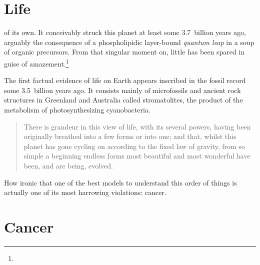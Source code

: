 \documentclass{tufte-book}
\begin{document}
\section{Life}

 of its own.  It conceivably struck this
planet at least some 3.7~billion years ago,\cite{schopf_evidence_2007}
arguably the consequence of a phospholipidic \mbox{layer-bound}
\emph{quantum leap} in a soup of organic
precursors.\cite{ohtomo_evidence_2014,miller_organic_1959} From that
singular moment on, little has been spared in guise of
amazement.\footnote{}

The first factual evidence of life on Earth appears inscribed in the
fossil record some 3.5~billion years ago.  It consists mainly of
microfossils and ancient rock structures in Greenland and Australia
called
stromatolites,\cite{ohtomo_evidence_2014,noffke_microbially_2013} the
product of the metabolism of photosynthesizing cyanobacteria.

\begin{quotation}
  There is grandeur in this view of life, with its several powers, having been
  originally breathed into a few forms or into one; and that, whilst this planet
  has gone cycling on according to the fixed law of gravity, from so simple a
  beginning endless forms most beautiful and most wonderful have been, and are
  being, evolved.
\end{quotation}

How ironic that one of the best models to understand this order of things is
actually one of its most harrowing violations: cancer.

\section{Cancer}

\backmatter



% 
% 
\end{document}
